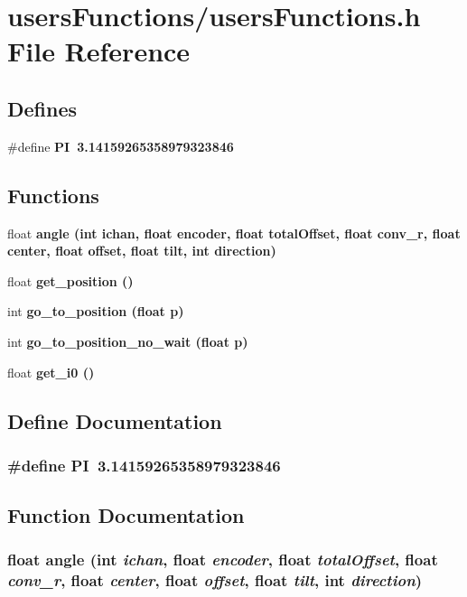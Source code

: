 \section{users\-Functions/users\-Functions.h File Reference}
\label{usersFunctions_8h}
\subsection*{Defines}
\begin{CompactItemize}
\item 
\#define \bf{PI}~3.14159265358979323846
\end{CompactItemize}
\subsection*{Functions}
\begin{CompactItemize}
\item 
float \bf{angle} (int ichan, float encoder, float total\-Offset, float conv\_\-r, float center, float offset, float tilt, int direction)
\item 
float \bf{get\_\-position} ()
\item 
int \bf{go\_\-to\_\-position} (float p)
\item 
int \bf{go\_\-to\_\-position\_\-no\_\-wait} (float p)
\item 
float \bf{get\_\-i0} ()
\end{CompactItemize}


\subsection{Define Documentation}
\subsubsection{\setlength{\rightskip}{0pt plus 5cm}\#define PI~3.14159265358979323846}\label{usersFunctions_8h_598a3330b3c21701223ee0ca14316eca}




\subsection{Function Documentation}
\subsubsection{\setlength{\rightskip}{0pt plus 5cm}float angle (int {\em ichan}, float {\em encoder}, float {\em total\-Offset}, float {\em conv\_\-r}, float {\em center}, float {\em offset}, float {\em tilt}, int {\em direction})}\label{usersFunctions_8h_bceeb897c561346124ee40760081c47b}


